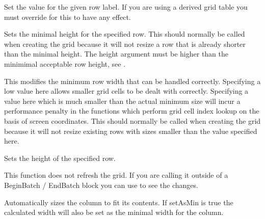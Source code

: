 
Set the value for the given row label. If you are using a derived grid table you must
override 
for this to have any effect.



\label{wxgridsetrowminimalheight}


Sets the minimal height for the specified row. This should normally be called when creating the grid
because it will not resize a row that is already shorter than the minimal height.
The height argument must be higher than the minimimal acceptable row height, see
.



\label{wxgridsetrowminimalacceptableheight}


This modifies the minimum row width that can be handled correctly. Specifying a low value here
allows smaller grid cells to be dealt with correctly. Specifying a value here which is much smaller
than the actual minimum size will incur a performance penalty in the functions which perform
grid cell index lookup on the basis of screen coordinates.
This should normally be called when creating the grid because it will not resize existing rows
with sizes smaller than the value specified here.



\label{wxgridsetrowsize}


Sets the height of the specified row.

This function does not refresh the grid. If you are calling it outside of a BeginBatch / EndBatch
block you can use  to see the changes.

Automatically sizes the column to fit its contents. If setAsMin is true the calculated width will
also be set as the minimal width for the column.


